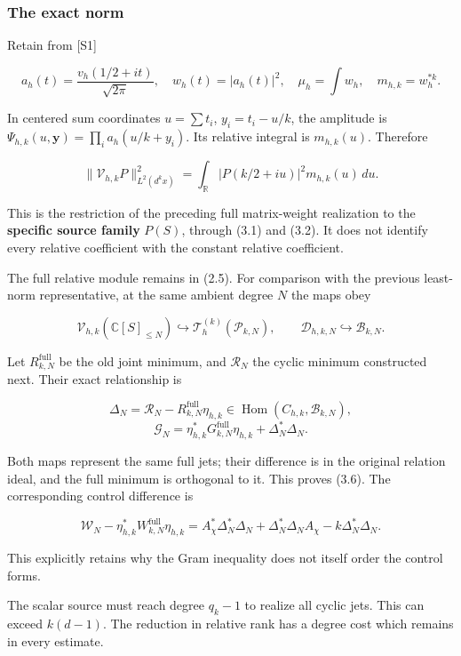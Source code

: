 \documentclass[
]{article}
\begin{document}
\subsubsection{The exact norm}\label{the-exact-norm}

Retain from {[}S1{]}

\[a_h(t)=\frac{v_h(1/2+it)}{\sqrt{2\pi}},\quad
w_h(t)=|a_h(t)|^2,\quad \mu_h=\int w_h,\quad m_{h,k}=w_h^{*k}.\]

In centered sum coordinates \(u=\sum t_i\), \(y_i=t_i-u/k\), the
amplitude is \(\Psi_{h,k}(u,\mathbf y)=\prod_i a_h(u/k+y_i)\). Its
relative integral is \(m_{h,k}(u)\). Therefore

\[\boxed{\|\mathcal V_{h,k}P\|_{L^2(d^kx)}^2
=\int_{\mathbb R}|P(k/2+iu)|^2m_{h,k}(u)\,du.}\tag{3.5}\]

This is the restriction of the preceding full matrix-weight realization
to the \textbf{specific source family} \(P(S)\), through (3.1) and
(3.2). It does not identify every relative coefficient with the constant
relative coefficient.

The full relative module remains in (2.5). For comparison with the
previous least-norm representative, at the same ambient degree \(N\) the
maps obey

\[\mathcal V_{h,k}(\mathbb C[S]_{\le N})\hookrightarrow
\mathcal T_h^{(k)}(\mathcal P_{k,N}),\qquad
\mathcal D_{h,k,N}\hookrightarrow\mathcal B_{k,N}.\]

Let \(R^{\mathrm{full}}_{k,N}\) be the old joint minimum, and
\(\mathcal R_N\) the cyclic minimum constructed next. Their exact
relationship is

\[\Delta_N=\mathcal R_N-R^{\mathrm{full}}_{k,N}\eta_{h,k}\in
\operatorname{Hom}(C_{h,k},\mathcal B_{k,N}),\]
\[\boxed{\mathcal G_N=\eta_{h,k}^*G^{\mathrm{full}}_{k,N}\eta_{h,k}+\Delta_N^*\Delta_N.}\tag{3.6}\]

Both maps represent the same full jets; their difference is in the
original relation ideal, and the full minimum is orthogonal to it. This
proves (3.6). The corresponding control difference is

\[\mathcal W_N-\eta_{h,k}^*W^{\mathrm{full}}_{k,N}\eta_{h,k}
=A_\chi^*\Delta_N^*\Delta_N+\Delta_N^*\Delta_NA_\chi-k\Delta_N^*\Delta_N.\tag{3.7}\]

This explicitly retains why the Gram inequality does not itself order
the control forms.

The scalar source must reach degree \(q_k-1\) to realize all cyclic
jets. This can exceed \(k(d-1)\). The reduction in relative rank has a
degree cost which remains in every estimate.
\end{document}
